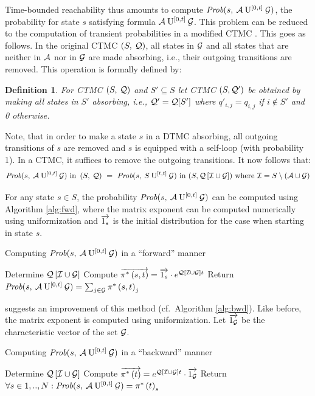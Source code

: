 \documentclass[a4paper,11pt]{article}
\newtheorem{definition}{Definition}
\begin{document}
		Time-bounded reachability thus amounts to compute $\mbox{\it Prob}(s, \: \mathcal{A} \: \mathrm{U}^{[0,t]} \: \mathcal{G} )$, the probability for state $s$ satisfying formula $\mathcal{A} \: \mathrm{U}^{[0,t]} \: \mathcal{G}$.  This problem can be reduced to the computation of transient probabilities in a modified CTMC \cite{BaierHHK_TSE03}.  This goes as follows.  In the original CTMC $\left( S,\: \mathcal{Q} \right)$, all states in $\mathcal{G}$ and all states that are neither in $\mathcal{A}$ nor in $\mathcal{G}$ are made absorbing, i.e., their outgoing transitions are removed.   This operation is formally defined by:
		\begin{definition}
		For CTMC $\left( S,\: \mathcal{Q} \right)$ and $S' \subseteq S$ let CTMC $(S, \mathcal{Q}')$  be obtained by making all states in $S'$ absorbing, i.e., $\mathcal{Q}' = \mathcal{Q}[S']$ where $q'_{i,j} = q_{i,j}$ if $i \not\in S'$ and 0 otherwise.
		\end{definition}
	
		Note, that in order to make a state $s$ in a DTMC absorbing, all outgoing transitions of $s$ are removed and $s$ is equipped with a self-loop (with probability 1).  In a CTMC, it suffices to remove the outgoing transitions.  It now follows that:
		$$
			\mbox{\it Prob}(s, \: \mathcal{A} \: \mathrm{U}^{[0,t]} \: \mathcal{G} ) \mbox{ in } \left( S,\: \mathcal{Q} \right) \ = \  \mbox{\it Prob}(s, \: S \: \mathrm{U}^{[t,t]} \: \mathcal{G} ) \mbox{ in } (S, \mathcal{Q}\left[ \mathcal{I} \cup \mathcal{G} \right]) \mbox{ where }   \mathcal{I}=S \setminus \left( \mathcal{A} \cup \mathcal{G}\right)
		$$
		
		For any state $s \in S$, the probability $\mbox{\it Prob}(s, \: \mathcal{A} \: \mathrm{U}^{[0,t]} \: \mathcal{G} )$ can be computed using Algorithm \ref{alg:fwd}, where the matrix exponent can be computed numerically using uniformization and $\overrightarrow{1_{s} }$ is the initial distribution for the case when starting in state $s$.
		\begin{algorithm}
			\caption{Computing $\mbox{\it Prob}(s, \: \mathcal{A} \: \mathrm{U}^{[0,t]} \: \mathcal{G} )$ in a ``forward'' manner}
			\label{alg:fwd}
			\begin{algorithmic}[1]
				\STATE Determine $\mathcal{Q}\left[ \mathcal{I} \cup \mathcal{G} \right]$
				\STATE Compute $\overrightarrow{\pi^{*} \left(s, t \right)} = \overrightarrow{1_{s} } \cdot e^{\mathcal{Q}\left[ \mathcal{I} \cup \mathcal{G} \right] t}$
				\STATE Return $\mbox{\it Prob}(s, \: \mathcal{A} \: \mathrm{U}^{[0,t]} \: \mathcal{G} ) = \sum_{j \in \mathcal{G}}\pi^{*} \left(s, t \right)_{j}$
			\end{algorithmic}
		\end{algorithm}
		\cite{KatoenKNP_LNCS01} suggests an improvement of this method (cf.\ Algorithm \ref{alg:bwd}).  Like before, the matrix exponent is computed using uniformization.  Let $\overrightarrow{1_{\mathcal{G}}}$ be the characteristic vector of the set $\mathcal{G}$.

		\begin{algorithm}
			\caption{Computing $\mbox{\it Prob}(s, \: \mathcal{A} \: \mathrm{U}^{[0,t]} \: \mathcal{G} )$ in a ``backward'' manner}
			\label{alg:bwd}
			\begin{algorithmic}[1]
				\STATE Determine $\mathcal{Q}\left[ \mathcal{I} \cup \mathcal{G} \right]$
				\STATE Compute $\overrightarrow{\pi^{*} \left( t \right)} = e^{\mathcal{Q}\left[ \mathcal{I} \cup \mathcal{G} \right] t} \cdot \overrightarrow{1_{\mathcal{G}}}$
				\STATE Return $\forall s \in 1,..,N : \mbox{\it Prob}(s, \: \mathcal{A} \: \mathrm{U}^{[0,t]} \: \mathcal{G} ) = \pi^{*} \left( t \right)_{s}$
			\end{algorithmic}
		\end{algorithm}
	
\end{document}
